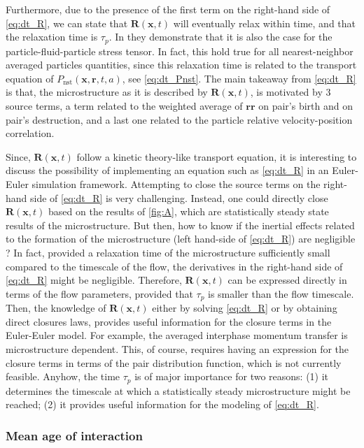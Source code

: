Furthermore, due to the presence of the first term on the right-hand side of \ref{eq:dt_R}, we can state that $\textbf{R}(\textbf{x},t)$ will eventually relax within time, and that the relaxation time is $\tau_p$. 
In \citet{zhang2023evolution} they demonstrate that it is also the case for the particle-fluid-particle stress tensor.
In fact, this hold true for all nearest-neighbor averaged particles quantities, since this relaxation time is related to the transport equation of $P_\text{nst}(\textbf{x},\textbf{r},t,a)$, see \ref{eq:dt_Pnst}.
The main takeaway from \ref{eq:dt_R} is that, the microstructure as it is described by $\textbf{R}(\textbf{x},t)$, is motivated by 3 source terms, a term related to the weighted average of $\textbf{rr}$ on pair's birth and on pair's destruction, and a last one related to the particle relative velocity-position correlation. 


Since, $\textbf{R}(\textbf{x},t)$ follow a kinetic theory-like transport equation, it is interesting to discuss the possibility of implementing an equation such as \ref{eq:dt_R} in an Euler-Euler simulation framework. 
Attempting to close the source terms on the right-hand side of \ref{eq:dt_R} is very challenging. 
Instead, one could directly close $\textbf{R}(\textbf{x},t)$ based on the results of \ref{fig:A}, which are statistically steady state results of the microstructure. 
But then, how to know if the inertial effects related to the formation of the microstructure  (left hand-side of \ref{eq:dt_R}) are negligible ?
In fact, provided a relaxation time of the microstructure sufficiently small compared to the timescale of the flow, the derivatives in the right-hand side of \ref{eq:dt_R} might be negligible.
Therefore, $\textbf{R}(\textbf{x},t)$ can be expressed directly in terms of the flow parameters, provided that $\tau_p$ is smaller than the flow timescale. 
Then, the knowledge of $\textbf{R}(\textbf{x},t)$ either by solving \ref{eq:dt_R} or by obtaining direct closures laws, provides useful information for the closure terms in the Euler-Euler model.
For example, the averaged interphase momentum transfer is microstructure dependent. 
This, of course, requires having an expression for the closure terms in terms of the pair distribution function, which is not currently feasible.
Anyhow, the time $\tau_p$ is of major importance for two reasons: 
(1) it determines the timescale at which a statistically steady microstructure might be reached; 
(2) it provides useful information for the modeling of \ref{eq:dt_R}.

\subsubsection*{Mean age of interaction}

